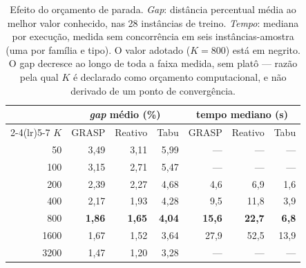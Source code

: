 \begin{table}[htbp]
\centering
\caption{Efeito do orçamento de parada. \emph{Gap}: distância percentual média ao melhor valor conhecido, nas 28 instâncias de treino. \emph{Tempo}: mediana por execução, medida sem concorrência em seis instâncias-amostra (uma por família e tipo). O valor adotado ($K=800$) está em negrito. O gap decresce ao longo de toda a faixa medida, sem platô --- razão pela qual $K$ é declarado como orçamento computacional, e não derivado de um ponto de convergência.}\label{tab:orcamento}
\begin{tabular}{r rrr rrr}
\toprule
& \multicolumn{3}{c}{\emph{gap} médio (\%)} & \multicolumn{3}{c}{tempo mediano (s)} \\
\cmidrule(lr){2-4}\cmidrule(lr){5-7}
$K$ & GRASP & Reativo & Tabu & GRASP & Reativo & Tabu \\
\midrule
50 & 3{,}49 & 3{,}11 & 5{,}99 & --- & --- & --- \\
100 & 3{,}15 & 2{,}71 & 5{,}47 & --- & --- & --- \\
200 & 2{,}39 & 2{,}27 & 4{,}68 & 4{,}6 & 6{,}9 & 1{,}6 \\
400 & 2{,}17 & 1{,}93 & 4{,}28 & 9{,}5 & 11{,}8 & 3{,}9 \\
800 & \textbf{1{,}86} & \textbf{1{,}65} & \textbf{4{,}04} & \textbf{15{,}6} & \textbf{22{,}7} & \textbf{6{,}8} \\
1600 & 1{,}67 & 1{,}52 & 3{,}64 & 27{,}9 & 52{,}5 & 13{,}9 \\
3200 & 1{,}47 & 1{,}20 & 3{,}28 & --- & --- & --- \\
\bottomrule
\end{tabular}
\end{table}
